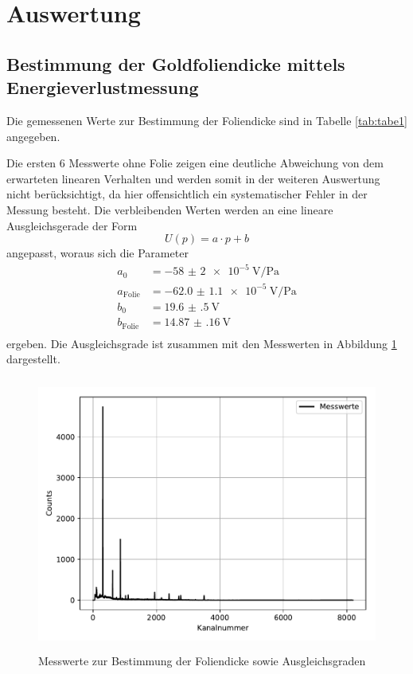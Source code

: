 \section{Auswertung}
\label{sec:Auswertung}
\subsection{Bestimmung der Goldfoliendicke mittels Energieverlustmessung}
Die gemessenen Werte zur Bestimmung der Foliendicke sind in Tabelle \ref{tab:tabe1} angegeben.

Die ersten 6 Messwerte ohne Folie zeigen eine deutliche Abweichung von dem erwarteten linearen
Verhalten und werden somit in der weiteren Auswertung nicht berücksichtigt, da hier offensichtlich ein
systematischer Fehler in der Messung besteht.
Die verbleibenden Werten werden an eine lineare Ausgleichsgerade
der Form
\begin{equation*}
  U(p)= a\cdot p+b
\end{equation*}
angepasst, woraus sich die Parameter
\begin{align*}
  a_0 &= \SI{-58(2)e-5}{\volt\per\pascal} \\
  a_{\text{Folie}} &= \SI{-62.0(11)e-5}{\volt\per\pascal} \\
  b_0 &= \SI{19.6(5)}{\volt} \\
  b_{\text{Folie}} &= \SI{14.87(16)}{\volt} \\
\end{align*}
ergeben.
Die Ausgleichsgrade ist zusammen mit den Messwerten in Abbildung \ref{fig:plot1} dargestellt.
\begin{figure}
  \centering
  \includegraphics[height=9cm]{Plot1.pdf}
  \caption{Messwerte zur Bestimmung der Foliendicke sowie Ausgleichsgraden}
  \label{fig:plot1}
\end{figure}
